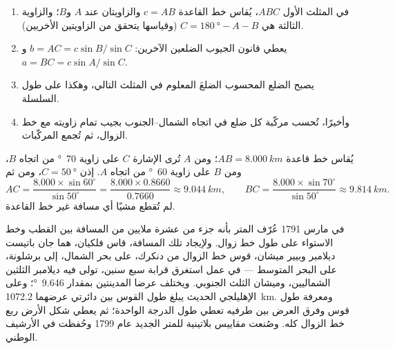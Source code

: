 \begin{method}\label{met:g10:measuring-the-earth:chain}
\begin{enumerate}
  \item في المثلث الأول $ABC$، يُقاس خط القاعدة $c = AB$ والزاويتان عند
        $A$ و$B$؛ والزاوية الثالثة هي
        $C = \qty{180}{\degree} - A - B$ (وقياسها يتحقق من
        الزاويتين الأخريين).
  \item يعطي قانون الجيوب الضلعين الآخرين:
        $b = AC = c \sin B / \sin C$ و$a = BC = c \sin A / \sin C$.
  \item يصبح الضلع المحسوب الضلعَ المعلوم في المثلث التالي، وهكذا
        على طول السلسلة.
  \item وأخيرًا، تُحسب مركّبة كل ضلع في اتجاه الشمال--الجنوب بجيب تمام زاويته
        مع خط الزوال، ثم تُجمع المركّبات.
\end{enumerate}
\end{method}

\begin{example}\label{ex:g10:measuring-the-earth:triangle}
يُقاس خط قاعدة $AB = \qty{8.000}{km}$؛ ومن $A$ تُرى الإشارة $C$ على زاوية
\qty{70}{\degree} من اتجاه $B$، ومن $B$ على زاوية
\qty{60}{\degree} من اتجاه $A$. إذن $C = \qty{50}{\degree}$، ومن ثم
\[
  AC = \frac{8.000 \times \sin 60^\circ}{\sin 50^\circ} = \frac{8.000 \times 0.8660}{0.7660}
  \approx \qty{9.044}{km}, \qquad
  BC = \frac{8.000 \times \sin 70^\circ}{\sin 50^\circ} \approx \qty{9.814}{km}.
\]
لم تُقطع مشيًا أي مسافة غير خط القاعدة.
\end{example}

\begin{example}\label{ex:g10:measuring-the-earth:meridian}
في مارس 1791 عُرّف المتر بأنه جزء من عشرة ملايين من المسافة بين القطب وخط
الاستواء على طول خط زوال. ولإيجاد تلك المسافة، قاس فلكيان، هما جان باتيست
ديلامبر وبيير ميشان،  قوس خط الزوال من دنكرك، على بحر الشمال، إلى
برشلونة، على البحر المتوسط --- في عمل استغرق قرابة سبع سنين، تولى فيه ديلامبر
الثلثين الشماليين، وميشان الثلث الجنوبي. ويختلف عرضا المدينتين بمقدار
\qty{9.646}{\degree}؛ وعلى الإهليلجي الحديث يبلغ طول القوس بين دائرتي عرضهما
\qty{1072.2}{km}. ومعرفة طول قوس وفرق العرض بين طرفيه تعطي طول الدرجة الواحدة؛
ثم يعطي شكل الأرض ربع خط الزوال كله. وصُنعت مقاييس بلاتينية للمتر الجديد
عام 1799 وحُفظت في الأرشيف الوطني.
\end{example}

